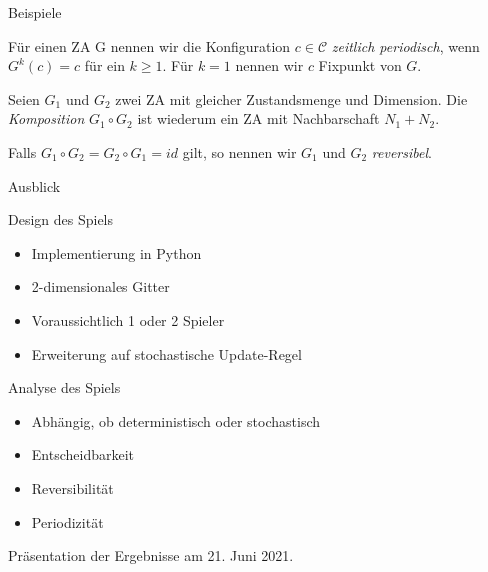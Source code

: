 \documentclass[aspectratio=169]{beamer}
\begin{document}
  \begin{frame}{Beispiele}
    \begin{example*}
      Für einen ZA G nennen wir die Konfiguration $c \in \mathcal{C}$ \textit{zeitlich periodisch}, wenn $G^k(c) = c$ für ein $k \geq 1$. Für $k= 1$ nennen wir $c$ Fixpunkt von $G$.
    \end{example*}

    \pause

    \begin{example*}
      Seien $G_1$ und $G_2$ zwei ZA mit gleicher Zustandsmenge und Dimension. Die \textit{Komposition} $G_1 \circ G_2$ ist wiederum ein ZA mit Nachbarschaft $N_1 + N_2$.

      Falls $G_1 \circ G_2 = G_2 \circ G_1 = id$ gilt, so nennen wir $G_1$ und $G_2$ \textit{reversibel}.
    \end{example*}

  \end{frame}



  \begin{frame}{Ausblick}
    \begin{block}{Design des Spiels}
      \begin{itemize}
        \item Implementierung in Python
        \item 2-dimensionales Gitter
        \item Voraussichtlich 1 oder 2 Spieler
        \item Erweiterung auf stochastische Update-Regel
      \end{itemize}
    \end{block}

    \pause

    \begin{block}{Analyse des Spiels}
      \begin{itemize}
        \item Abhängig, ob deterministisch oder stochastisch
        \item Entscheidbarkeit
        \item Reversibilität
        \item Periodizität
      \end{itemize}

    \end{block}


  \end{frame}



  \begin{frame}{}
    \begin{block}{}

      {
          \centering
          \huge
          Präsentation der Ergebnisse am 21. Juni 2021.
      }

    \end{block}

  \end{frame}
\end{document}
